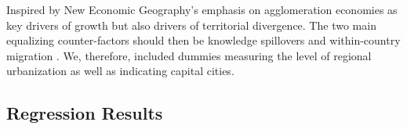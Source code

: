 \documentclass[11pt]{article}
\begin{document}
Inspired by New Economic Geography's emphasis on agglomeration economies as key drivers of growth but also drivers of territorial divergence. The two main equalizing counter-factors should then be knowledge spillovers and within-country migration  \citep{iammarino2017regional}. We, therefore, included dummies measuring the level of regional urbanization as well as indicating capital cities. %

\subsection{Regression Results}


\end{document}
